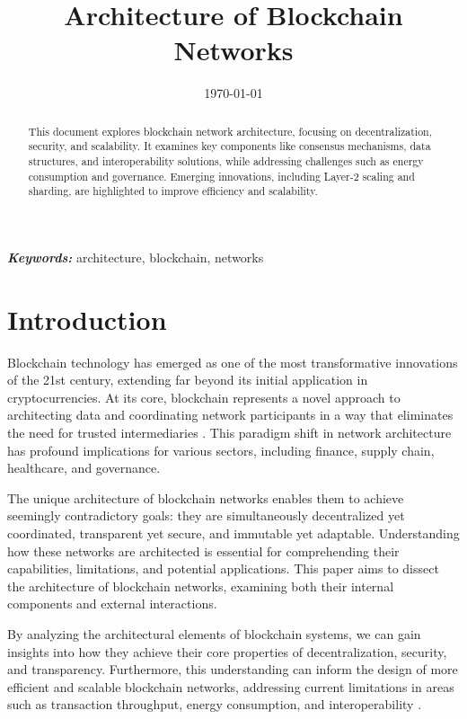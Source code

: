 \documentclass[twoside]{article}
\begin{document}

\title{Architecture of Blockchain Networks}
\author{}
\date{\today}
\maketitle

\begin{abstract}
  \raggedright
  This document explores blockchain network architecture, focusing on decentralization, security, and scalability. It examines key components like consensus mechanisms, data structures, and interoperability solutions, while addressing challenges such as energy consumption and governance. Emerging innovations, including Layer-2 scaling and sharding, are highlighted to improve efficiency and scalability.
\end{abstract}

\begin{justify}
  \textbf{\textit{Keywords:}} architecture, blockchain, networks
\end{justify}

\section{Introduction}
Blockchain technology has emerged as one of the most transformative innovations of the 21st century, extending far beyond its initial application in cryptocurrencies. At its core, blockchain represents a novel approach to architecting data and coordinating network participants in a way that eliminates the need for trusted intermediaries \cite{reasearchgate}. This paradigm shift in network architecture has profound implications for various sectors, including finance, supply chain, healthcare, and governance.

The unique architecture of blockchain networks enables them to achieve seemingly contradictory goals: they are simultaneously decentralized yet coordinated, transparent yet secure, and immutable yet adaptable. Understanding how these networks are architected is essential for comprehending their capabilities, limitations, and potential applications. This paper aims to dissect the architecture of blockchain networks, examining both their internal components and external interactions.

By analyzing the architectural elements of blockchain systems, we can gain insights into how they achieve their core properties of decentralization, security, and transparency. Furthermore, this understanding can inform the design of more efficient and scalable blockchain networks, addressing current limitations in areas such as transaction throughput, energy consumption, and interoperability \cite{patnaik}.
\end{document}
